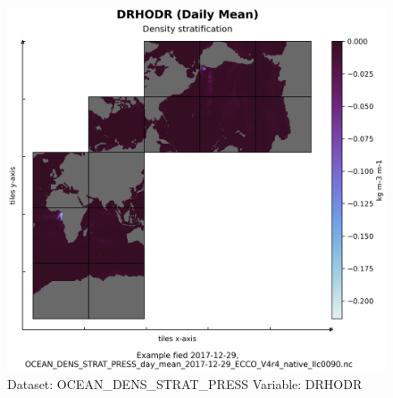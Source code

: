\begin{figure}[H]
\centering
\includegraphics[scale=0.55]{../images/plots/native_plots/Ocean_Density_Stratification_and_Hydrostatic_Pressure/DRHODR.png}
\caption{Dataset: OCEAN\_DENS\_STRAT\_PRESS Variable: DRHODR}
\label{tab:table-OCEAN_DENS_STRAT_PRESS_DRHODR-Plot}
\end{figure}
\pagebreak
